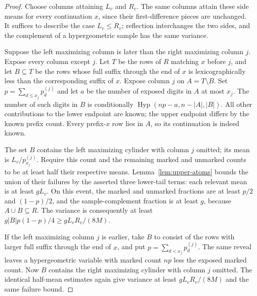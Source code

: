 \documentclass[11pt]{article}
\numberwithin{equation}{section}
\theoremstyle{definition}
\theoremstyle{remark}
\newcommand{\1}{\mathbf 1}
\begin{document}
\begin{proof}
Choose columns attaining $L_v$ and $R_v$. The same columns attain
these side means for every continuation $x$, since their
first-difference pieces are unchanged. It suffices to describe the
case $L_v\le R_v$; reflection interchanges the two sides, and the
complement of a hypergeometric sample has the same variance.

Suppose the left maximizing column is later than the right maximizing
column $j$. Expose every column except $j$. Let $T$ be the rows of
$R$ matching $x$ before $j$, and let $B\subseteq T$ be the rows whose
full suffix through the end of $x$ is lexicographically less than
the corresponding suffix of $x$. Expose column $j$ on
$A=T\setminus B$. Set $p=\sum_{d\le x_j}p_d^{(j)}$ and let $a$
be the number of exposed digits in $A$ at most $x_j$. The number
of such digits in $B$ is conditionally
$\operatorname{Hyp}(np-a,n-|A|,|B|)$. All other contributions to the
lower endpoint are known; the upper endpoint differs by the known
prefix count. Every prefix-$x$ row lies in $A$, so its continuation
is indeed known.

The set $B$ contains the left maximizing cylinder with column $j$
omitted; its mean is $L_v/p_{x_j}^{(j)}$. Require this count and
the remaining marked and unmarked counts to be at least half their
respective means. Lemma~\ref{lem:upper-atoms} bounds the union of
their failures by the asserted three lower-tail terms: each relevant
mean is at least $gL_v$. On this event, the marked and unmarked
fractions are at least $p/2$ and $(1-p)/2$, and the sample-complement
fraction is at least $g$, because $A\cup B\subseteq R$.
The variance is consequently at least
$g|B|p(1-p)/4\ge gL_vR_v/(8M)$.

If the left maximizing column $j$ is earlier, take $B$ to consist of
the rows with larger full suffix through the end of $x$,
and put $p=\sum_{d<x_j}p_d^{(j)}$. The same reveal leaves a
hypergeometric variable with marked count $np$ less the exposed
marked count. Now $B$ contains the right maximizing cylinder with
column $j$ omitted. The identical half-mean estimates again give
variance at least $gL_vR_v/(8M)$ and the same failure bound.


\end{proof}
\end{document}
